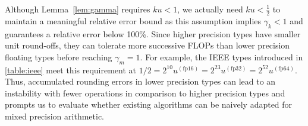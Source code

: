\documentclass[review,onefignum,onetabnum]{siamart190516}
\begin{document}
Although Lemma~\ref{lem:gamma} requires $ku<1$, we actually need $ku <\frac{1}{2}$ to maintain a meaningful relative error bound as this assumption implies $\gamma_k < 1$ and guarantees a relative error below 100\%. 
Since higher precision types have smaller unit round-offs, they can tolerate more successive FLOPs than lower precision floating types before reaching $\gamma_m=1$.
For example, the IEEE types introduced in \cref{table:ieee} meet this requirement at $1/2=2^{10}u^{(\text{fp16})}=2^{23}u^{(\text{fp32})}=2^{52}u^{(\text{fp64})}$.
Thus, accumulated rounding errors in lower precision types can lead to an instability with fewer operations in comparison to higher precision types and prompts us to evaluate whether existing algorithms can be naively adapted for mixed precision arithmetic.
\end{document}
